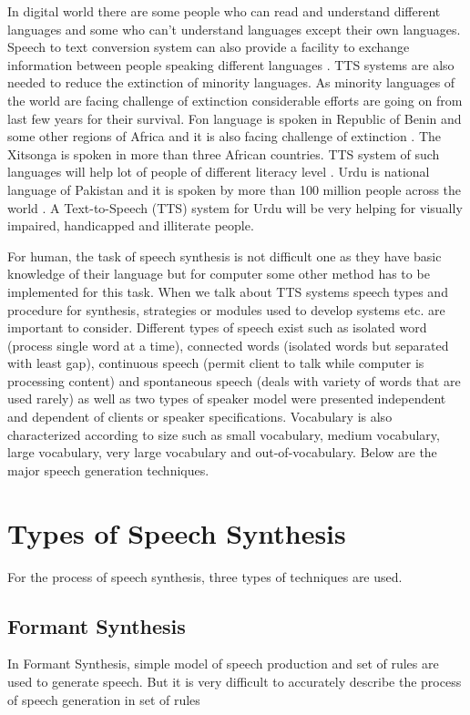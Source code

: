 In digital world there are some people who can read and understand different languages and some
who can’t understand languages except their own languages. Speech to text conversion system can
also provide a facility to exchange information between people speaking different languages \cite{khilari2015review}. 
TTS systems are also needed to reduce the extinction of
minority languages. As minority languages of the world are facing challenge of extinction
considerable efforts are going on from last few years for their survival. Fon language is spoken in
Republic of Benin and some other regions of Africa and it is also facing challenge of extinction \cite{dagba2014text}. 
The Xitsonga is spoken in more than three African countries.
TTS system of such languages will help lot of people of different literacy level \cite{baloyi2012text}.
Urdu is national language of Pakistan and it is spoken by more than 100 million people across the world \cite{top_30_languages}.
A Text-to-Speech (TTS) system for Urdu will be very helping for visually impaired, handicapped and illiterate people.

For human, the task of speech synthesis is not difficult one as they have basic knowledge of their
language but for computer some
other method has to be implemented for this task. When we talk about TTS systems speech types
and procedure for synthesis, strategies or modules used to develop systems etc. are important to
consider. Different types of speech exist such as isolated word (process single word at a time),
connected words (isolated words but separated with least gap), continuous speech (permit client
to talk while computer is processing content) and spontaneous speech (deals with variety of words
that are used rarely) as well as two types of speaker model were presented independent and
dependent of clients or speaker specifications. Vocabulary is also characterized according to size
such as small vocabulary, medium vocabulary, large vocabulary, very large vocabulary and out-of-vocabulary.
Below are the major speech generation techniques.

\section{Types of Speech Synthesis}
For the process of speech synthesis, three types of techniques are used.

\subsection{Formant Synthesis}
In Formant Synthesis, simple model of speech production and set of rules are used to generate
speech. But it is very difficult to accurately describe the process of speech generation in set of
rules

